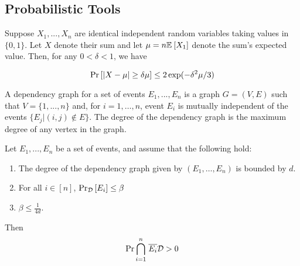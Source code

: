 \documentclass[11pt]{article}
\begin{document}
\newpage

\subsection{Probabilistic Tools}

\begin{lemma}\label{lemma:mult-chernoff}
Suppose $X_1, ..., X_n$ are identical independent random variables taking values in $\{0, 1\}$. Let $X$ denote their sum and let $\mu = n\mathbb{E}_{}\left[X_1\right]$ denote the sum's expected value. Then, for any $0 < \delta < 1$, we have

\[ \Pr\left[|X - \mu| \geq \delta \mu \right] \leq 2\exp(-\delta^2\mu/3)\]

\end{lemma}


A dependency graph for a set of events $E_1, . . . , E_n$ is a graph $G=(V, E)$ such that $V = \{1,.. . , n\}$ and,  for $i= 1,\dots, n$, event $E_i$ is mutually independent
of the events $\{E_j | (i, j) \notin E\}$. The degree of the dependency graph is the maximum degree of any vertex in the graph.


\begin{lemma}\label{lemma:lll}
Let $E_1,...,E_n$ be a set of events, and assume that the following hold:
\begin{enumerate}
\item The degree of the dependency graph given by $(E_1, \dots, E_n)$ is bounded by $d$.

\item For all $i \in [n]$, $\Pr_{\mathcal{D}}\left[E_i \right] \leq \beta$

\item $\beta \leq \frac{1}{4d}$.
\end{enumerate}
Then
\[ \Pr{\overset{n}{ \underset{i=1}{\bigcap}} \hspace{0.1cm}  \overline{E_i}}{\mathcal{D}} > 0\]


\end{lemma}

\end{document}
